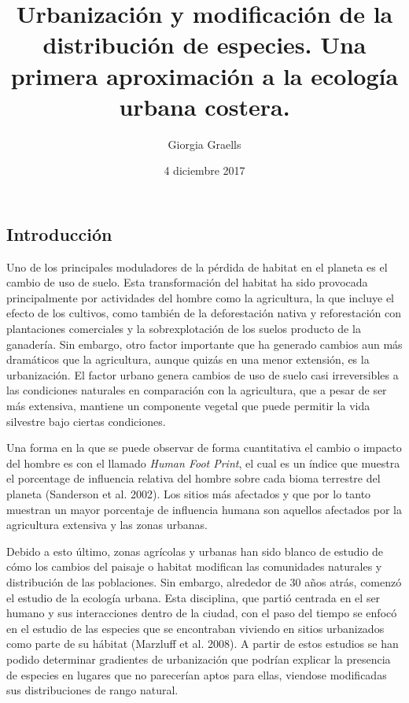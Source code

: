 \documentclass[]{article}
\title{Urbanización y modificación de la distribución de especies. Una primera
aproximación a la ecología urbana costera.}
\author{Giorgia Graells}
\date{4 diciembre 2017}
\begin{document}
\maketitle

\subsection{Introducción}\label{introduccion}

Uno de los principales moduladores de la pérdida de habitat en el
planeta es el cambio de uso de suelo. Esta transformación del habitat ha
sido provocada principalmente por actividades del hombre como la
agricultura, la que incluye el efecto de los cultivos, como también de
la deforestación nativa y reforestación con plantaciones comerciales y
la sobrexplotación de los suelos producto de la ganadería. Sin embargo,
otro factor importante que ha generado cambios aun más dramáticos que la
agricultura, aunque quizás en una menor extensión, es la urbanización.
El factor urbano genera cambios de uso de suelo casi irreversibles a las
condiciones naturales en comparación con la agricultura, que a pesar de
ser más extensiva, mantiene un componente vegetal que puede permitir la
vida silvestre bajo ciertas condiciones.

Una forma en la que se puede observar de forma cuantitativa el cambio o
impacto del hombre es con el llamado \emph{Human Foot Print}, el cual es
un índice que muestra el porcentage de influencia relativa del hombre
sobre cada bioma terrestre del planeta (Sanderson et al. 2002). Los
sitios más afectados y que por lo tanto muestran un mayor porcentaje de
influencia humana son aquellos afectados por la agricultura extensiva y
las zonas urbanas.

Debido a esto último, zonas agrícolas y urbanas han sido blanco de
estudio de cómo los cambios del paisaje o habitat modifican las
comunidades naturales y distribución de las poblaciones. Sin embargo,
alrededor de 30 años atrás, comenzó el estudio de la ecología urbana.
Esta disciplina, que partió centrada en el ser humano y sus
interacciones dentro de la ciudad, con el paso del tiempo se enfocó en
el estudio de las especies que se encontraban viviendo en sitios
urbanizados como parte de su hábitat (Marzluff et al. 2008). A partir de
estos estudios se han podido determinar gradientes de urbanización que
podrían explicar la presencia de especies en lugares que no parecerían
aptos para ellas, viendose modificadas sus distribuciones de rango
natural.
\end{document}
